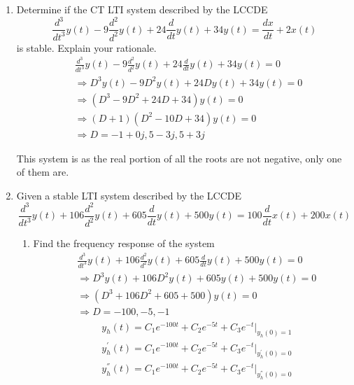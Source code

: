 \documentclass{article}
\begin{document}
\begin{enumerate}
    \item Determine if the CT LTI system described by the LCCDE
    \begin{equation}
        \frac{d^3}{dt^3}y(t)-9\frac{d^2}{d^2}y(t) + 24\frac{d}{dt}y(t)+34y(t) = \frac{dx}{dt} +2x(t)
    \end{equation}
    is stable. Explain your rationale.
    \begin{align}
        &\frac{d^3}{dt^3}y(t)-9\frac{d^2}{d^2}y(t) + 24\frac{d}{dt}y(t)+34y(t) = 0\\
        &\Rightarrow D^3y(t)-9D^2y(t) + 24Dy(t)+34y(t) = 0\\
        &\Rightarrow (D^3-9D^2 + 24D+34)y(t) = 0\\
        &\Rightarrow (D + 1)(D^2-10D + 34)y(t) = 0\\
        &\Rightarrow D = -1 + 0j, 5-3j, 5+3j
    \end{align}
    \begin{center}
        This system is  as the real portion of all the roots are not negative, only one of them are.
    \end{center}
    \newpage
    \item Given a stable LTI system described by the LCCDE
    \begin{equation}
        \frac{d^3}{dt^3}y(t)+106\frac{d^2}{d^2}y(t) + 605\frac{d}{dt}y(t)+500y(t) = 100\frac{d}{dt}x(t) +200x(t)
    \end{equation}
    \begin{enumerate}
        \item Find the frequency response of the system
        \begin{align}
            &\frac{d^3}{dt^3}y(t)+106\frac{d^2}{d^2}y(t) + 605\frac{d}{dt}y(t)+500y(t) = 0\\
            &\Rightarrow D^3y(t)+106D^2y(t) + 605y(t)+500y(t) = 0\\
            &\Rightarrow (D^3+106D^2 + 605+500)y(t) = 0\\
            &\Rightarrow D = -100, -5, -1
        \end{align}
        \begin{align}
            &y_h(t) = C_1e^{-100t}+C_2e^{-5t}+C_3e^{-t}\big|_{y_h(0)=1}\\
            &y^{'}_h(t) = C_1e^{-100t}+C_2e^{-5t}+C_3e^{-t}\big|_{y^{'}_h(0)=0}\\
            &y^{''}_h(t) = C_1e^{-100t}+C_2e^{-5t}+C_3e^{-t}\big|_{y^{''}_h(0)=0}\\

\end{align}
\end{enumerate}
\end{enumerate}
\end{document}

